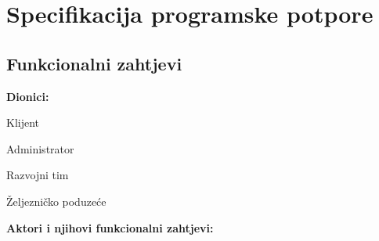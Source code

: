 \chapter{Specifikacija programske potpore}
		
	\section{Funkcionalni zahtjevi}
			
			\noindent \textbf{Dionici:}
			
			\begin{packed_enum}
				
				\item Klijent
				\item Administrator				
				\item Razvojni tim
				\item Željezničko poduzeće
				
			\end{packed_enum}
			
			\noindent \textbf{Aktori i njihovi funkcionalni zahtjevi:}
			
